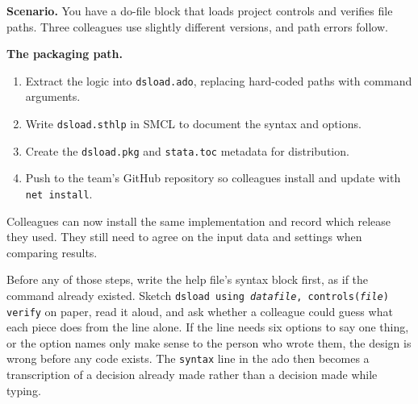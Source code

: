 \documentclass[
    a4paper,
    fontsize=10pt,
    twoside=true,
    numbers=noenddot,
]{kaobook}
\newcounter{appliedexample}
\newenvironment{appliedexample}[1][]{%
    \refstepcounter{appliedexample}%
    \begin{appliedexamplebox}[frametitle={Applied Example~\theappliedexample.~~#1}]%
}{%
    \end{appliedexamplebox}%
}
\begin{document}
\begin{appliedexample}[Turning a one-off script into a shared tool]\label{ae:ch15-sharedtool}
\textbf{Scenario.} You have a do-file block that loads project controls and verifies file paths. Three colleagues use slightly different versions, and path errors follow.

\medskip
\textbf{The packaging path.}
\begin{enumerate}
    \item Extract the logic into \texttt{dsload.ado}, replacing hard-coded paths with command arguments.
    \item Write \texttt{dsload.sthlp} in SMCL to document the syntax and options.
    \item Create the \texttt{dsload.pkg} and \texttt{stata.toc} metadata for distribution.
    \item Push to the team's GitHub repository so colleagues install and update with \texttt{net install}.
\end{enumerate}
Colleagues can now install the same implementation and record which release they used. They still need to agree on the input data and settings when comparing results.
\end{appliedexample}

Before any of those steps, write the help file's syntax block first, as if the command already existed. Sketch \texttt{dsload using \textit{datafile}, controls(\textit{file}) verify} on paper, read it aloud, and ask whether a colleague could guess what each piece does from the line alone. If the line needs six options to say one thing, or the option names only make sense to the person who wrote them, the design is wrong before any code exists. The \texttt{syntax} line in the ado then becomes a transcription of a decision already made rather than a decision made while typing.
\end{document}
